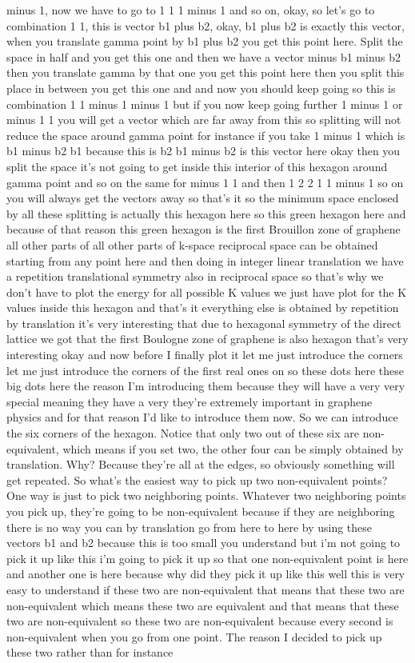 minus 1, now we have to go to 1 1 1 minus 1 and so on, okay, so let's go to combination 1 1, this is vector b1 plus b2, okay, b1 plus b2 is exactly this vector, when you translate gamma point by b1 plus b2 you get this point here. Split the space in half and you get this one and then we have a vector minus b1 minus b2 then you translate gamma by that one you get this point here then you split this place in between you get this one and and now you should keep going so this is combination 1 1 minus 1 minus 1 but if you now keep going further 1 minus 1 or minus 1 1 you will get a vector which are far away from this so splitting will not reduce the space around gamma point for instance if you take 1 minus 1 which is b1 minus b2 b1 because this is b2 b1 minus b2 is this vector here okay then you split the space it's not going to get inside this interior of this hexagon around gamma point and so on the same for minus 1 1 and then 1 2 2 1 1 minus 1 so on you will always get the vectors away so that's it so the minimum space enclosed by all these splitting is actually this hexagon here so this green hexagon here and because of that reason this green hexagon is the first Brouillon zone of graphene all other parts of all other parts of k-space reciprocal space can be obtained starting from any point here and then doing in integer linear translation we have a repetition translational symmetry also in reciprocal space so that's why we don't have to plot the energy for all possible K values we just have plot for the K values inside this hexagon and that's it everything else is obtained by repetition by translation it's very interesting that due to hexagonal symmetry of the direct lattice we got that the first Boulogne zone of graphene is also hexagon that's very interesting okay and now before I finally plot it let me just introduce the corners let me just introduce the corners of the first real ones on so these dots here these big dots here the reason I'm introducing them because they will have a very very special meaning they have a very they're extremely important in graphene physics and for that reason I'd like to introduce them now. So we can introduce the six corners of the hexagon. Notice that only two out of these six are non-equivalent, which means if you set two, the other four can be simply obtained by translation. Why? Because they're all at the edges, so obviously something will get repeated. So what's the easiest way to pick up two non-equivalent points? One way is just to pick two neighboring points. Whatever two neighboring points you pick up, they're going to be non-equivalent because if they are neighboring there is no way you can by translation go from here to here by using these vectors b1 and b2 because this is too small you understand but i'm not going to pick it up like this i'm going to pick it up so that one non-equivalent point is here and another one is here because why did they pick it up like this well this is very easy to understand if these two are non-equivalent that means that these two are non-equivalent which means these two are equivalent and that means that these two are non-equivalent so these two are non-equivalent because every second is non-equivalent when you go from one point. The reason I decided to pick up these two rather than for instance 